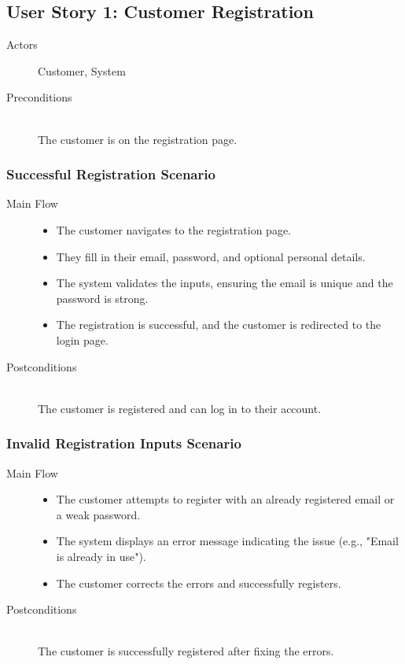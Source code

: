 \documentclass[a4paper,journal]{IEEEtran}
\begin{document}
\subsection{User Story 1: Customer Registration}
\begin{description}
  \item[Actors] Customer, System
  \item[Preconditions] \hfill \\
    The customer is on the registration page.
\end{description}
\subsubsection{Successful Registration Scenario}
\begin{description}
  \item[Main Flow] \hfill
    \begin{itemize}
      \item The customer navigates to the registration page.
      \item They fill in their email, password, and optional personal details.
      \item The system validates the inputs, ensuring the email is unique and the
        password is strong.
      \item The registration is successful, and the customer is redirected to the
        login page.
    \end{itemize}
  \item[Postconditions] \hfill \\
    The customer is registered and can log in to their account.
\end{description}
\subsubsection{Invalid Registration Inputs Scenario}
\begin{description}
  \item[Main Flow] \hfill
    \begin{itemize}
      \item The customer attempts to register with an already registered email
        or a weak password.
      \item The system displays an error message indicating the issue
        (e.g., "Email is already in use").
      \item The customer corrects the errors and successfully registers.
    \end{itemize}
  \item[Postconditions] \hfill \\
    The customer is successfully registered after fixing the errors.
\end{description}
\end{document}
